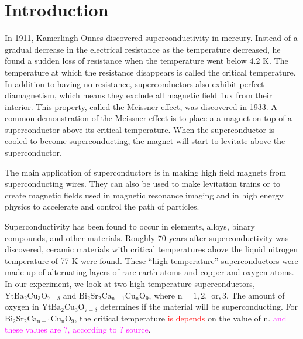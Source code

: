 \documentclass[prb,preprint]{revtex4-1}
\begin{document}
\maketitle %


\section{Introduction} %
In 1911, Kamerlingh Onnes discovered superconductivity in mercury.  
Instead of a gradual decrease in the electrical resistance as the temperature decreased, he found a sudden loss of resistance when the temperature went below 4.2 K. 
The temperature at which the resistance disappears is called the critical temperature.
In addition to having no resistance, superconductors also exhibit perfect diamagnetism, which means they exclude all magnetic field flux from their interior. 
This property, called the Meissner effect, was discovered in 1933.\cite{intro}
A common demonstration of the Meissner effect is to place a a magnet on top of a superconductor above its critical temperature. When the superconductor is cooled to become superconducting, the magnet will start to levitate above the superconductor. 

The main application of superconductors is in making high field magnets from superconducting wires. They can also be used to make levitation trains or to create magnetic fields used in magnetic resonance imaging and in high energy physics to accelerate and control the path of particles.\cite{kumar} 

Superconductivity has been found to occur in elements, alloys, binary compounds, and other materials.  
Roughly 70 years after superconductivity was discovered, ceramic materials with critical temperatures above the liquid nitrogen temperature of 77 K were found.\cite{melissinos} 
These ``high temperature'' superconductors were made up of alternating layers of rare earth atoms and copper and oxygen atoms.\cite{kumar} 
In our experiment, we look at two high temperature superconductors, $\textrm{Yt}\textrm{Ba}_{2}\textrm{Cu}_{3}\textrm{O}_{7-\delta}$ and $\textrm{Bi}_{2}\textrm{Sr}_{2}\textrm{Ca}_{\textrm{n}-1}\textrm{Cu}_{\textrm{n}}\textrm{O}_{9}$, where $\textrm{n}=1,2,\textrm{ or},3$. %
The amount of oxygen in $\textrm{Yt}\textrm{Ba}_{2}\textrm{Cu}_{3}\textrm{O}_{7-\delta}$ determines if the material will be superconducting.\cite{colorado} For $\textrm{Bi}_{2}\textrm{Sr}_{2}\textrm{Ca}_{\textrm{n}-1}\textrm{Cu}_{\textrm{n}}\textrm{O}_{9}$, the critical temperature \textcolor{red}{is depends} on the value of n. \textcolor{magenta}{and these values are ?, according to ? source}. 
\end{document}
